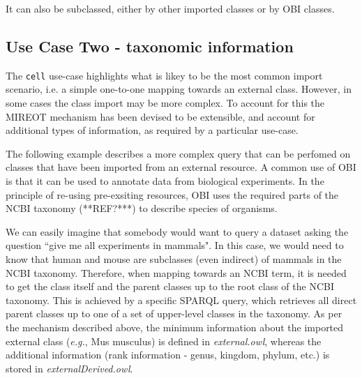 \documentclass[a4paper,10pt,twocolumn]{article}
\begin{document}
It can also be subclassed, either by other imported classes or by OBI classes.
\subsection*{Use Case Two - taxonomic information}

The \texttt{cell} use-case highlights what is likey to be the most common import scenario, i.e. a simple one-to-one mapping towards an external class. 
However, in some cases the class import may be more complex. To account for this the MIREOT mechanism has been devised to be extensible, and account for additional types of information, as required by a particular use-case.

The following example describes a more complex query that can be perfomed on classes that have been imported from an external resource. A common use of OBI is that it can be used to annotate data from biological experiments. 
In the principle of re-using pre-exsiting resources, OBI uses the required parts of the NCBI taxonomy (**REF?***) to describe species of organisms. 


We can easily imagine that somebody would want to query a dataset asking the question ``give me all experiments in mammals". In this case, we would need to know that human and mouse are subclasses (even indirect) of mammals in the NCBI taxonomy.
Therefore, when mapping towards an NCBI term, it is needed to get the class itself and the parent classes up to the root class of the NCBI taxonomy.
This is achieved by a specific SPARQL query, which retrieves all direct parent classes up to one of a set of upper-level classes in the taxonomy.%
As per the mechanism described above, the minimum information about the imported external class (\emph{e.g.}, Mus musculus) is defined in \emph{external.owl}, whereas the additional information (rank information - genus, kingdom, phylum, etc.) is stored in \emph{ externalDerived.owl}. 



\end{document}
